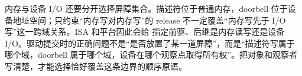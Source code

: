 内存与设备 I/O 还要分开选择屏障集合。描述符位于普通内存，doorbell 位于设备地址空间；只约束“内存写对内存写”的 release 不一定覆盖“内存写先于 I/O 写”这一跨域关系。ISA 和平台因此会给  指定前驱、后继是内存读写还是设备 I/O。驱动提交时的正确问题不是“是否放置了某一道屏障”，而是“描述符写属于哪个域，doorbell 属于哪个域，设备在哪个观察点取得所有权”。把对象和观察者写清楚，才能选择恰好覆盖这条边界的顺序原语。
